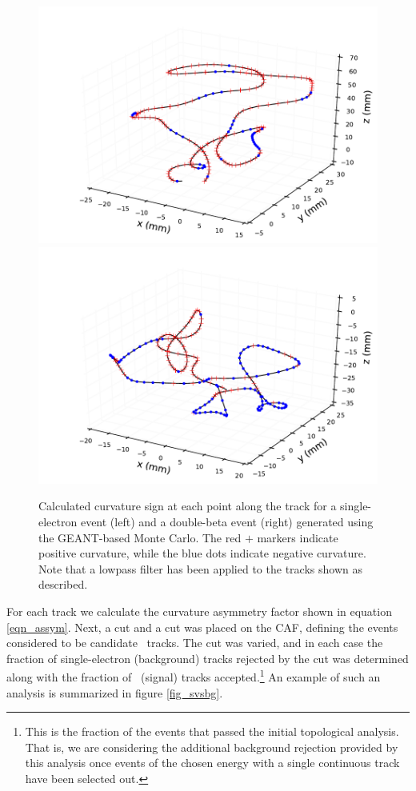 \documentclass{JINST}
\begin{document}
\begin{figure}[!htb]
	\includegraphics[scale=0.48]{fig/plt_trkcurv_nmagse2_6.pdf}
	\includegraphics[scale=0.48]{fig/plt_trkcurv_nmagbb2_2.pdf}
	\caption{\label{fig_trkcurv}Calculated curvature sign at each point along the track for a single-electron event (left) and a double-beta event (right) generated using the GEANT-based Monte Carlo.  The red $+$ markers indicate positive curvature, while the blue dots indicate negative curvature.  Note that a lowpass filter has been applied to the tracks shown as described.}
\end{figure}

For each track we calculate the curvature asymmetry factor shown in equation \ref{eqn_assym}. Next, a cut and
a cut was placed on the CAF, defining the events considered to be candidate 
\bbonu\ tracks.  The cut was varied, and in each case 
the fraction of single-electron (background) tracks rejected by the cut was determined along with the fraction of 
\bbonu\ (signal) tracks accepted.\footnote{This is the fraction of the events that passed the initial 
topological analysis. That is, we are considering the additional background rejection provided by this analysis  
once events of the chosen energy with a single continuous track have been selected out.}  An example of such 
an analysis is summarized in figure \ref{fig_svsbg}.
\end{document}
